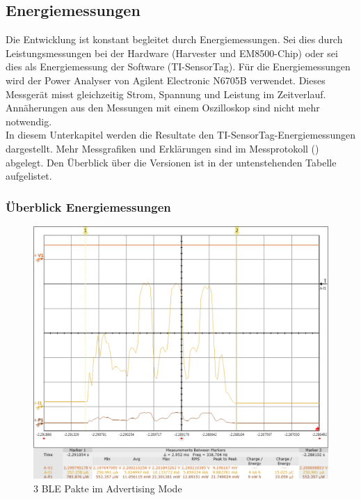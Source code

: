 \subsection{Energiemessungen}
\label{v_messungen_sensortag}


Die Entwicklung ist konstant begleitet durch Energiemessungen. Sei dies durch Leistungsmessungen bei der Hardware (Harvester und EM8500-Chip) oder sei dies als Energiemessung der Software (TI-SensorTag). Für die Energiemessungen wird der Power Analyser von Agilent Electronic N6705B verwendet. Dieses Messgerät misst gleichzeitig Strom, Spannung und Leistung im Zeitverlauf. Annäherungen aus den Messungen mit einem Oszilloskop sind nicht mehr notwendig.\\

In diesem Unterkapitel werden die Resultate den TI-SensorTag-Energiemessungen dargestellt. Mehr Messgrafiken und Erklärungen sind im Messprotokoll (\cite{messung_energie_sensortag}) abgelegt. Den Überblick über die Versionen ist in der untenstehenden Tabelle aufgelistet. 


\subsubsection{Überblick Energiemessungen}\label{erst_EMessungen}

\begin{figure}[ht]
    \includegraphics[width=1.0\textwidth]{3Vorgehen/imag/v0Send33uJ.png} 
    \caption{3 BLE Pakte im Advertising Mode}
    \label{BLE_send}
\end{figure}

